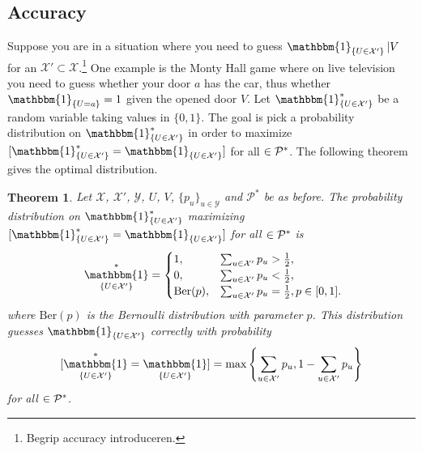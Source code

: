 \documentclass[twoside,a4paper]{report}
\theoremstyle{plain}
\newtheorem{theorem}{Theorem}[section]
\theoremstyle{definition}
\theoremstyle{remark}
\numberwithin{equation}{chapter}
\let\P\relax
\DeclareMathOperator{\P}{\mathbb{P}}
\DeclareMathOperator{\1}{\mathbbm{1}}
\newcommand{\X}{\mathcal{X}}
\newcommand{\Y}{\mathcal{Y}}
\newcommand{\Pmod}{\mathcal{P}^*}
\newcommand{\GeneralGenInd}{\1_{\{U\in\X'\}}}
\begin{document}
\subsection{Accuracy}
Suppose you are in a situation where you need to guess $\GeneralGenInd|V$ for an $\X'\subset\X$.\footnote{Begrip accuracy introduceren.} One example is the Monty Hall game where on live television you need to guess whether your door $a$ has the car, thus whether $\1_{\{U=a\}}=1$ given the opened door $V$. Let $\GeneralGenInd^*$ be a random variable taking values in $\{0,1\}$. The goal is pick a probability distribution on $\GeneralGenInd^*$ in order to maximize $\P[\GeneralGenInd^*=\GeneralGenInd]$ for all $\P\in\Pmod$. The following theorem gives the optimal distribution.
\begin{theorem}\label{thm:DiscAccOpt}
Let $\X$, $\X'$, $\Y$, $U$, $V$, $\{p_u\}_{u\in\Y}$ and $\Pmod$ be as before. The probability distribution on $\GeneralGenInd^*$ maximizing $\P[\GeneralGenInd^*=\GeneralGenInd]$ for all $\P\in\Pmod$ is
\begin{equation}\
\GeneralGenInd^*=\begin{cases}
1,&\sum_{u\in\X'}p_u>\frac{1}{2},\\
0,&\sum_{u\in\X'}p_u<\frac{1}{2},\\
\mathrm{Ber}(p),&\sum_{u\in\X'}p_u=\frac{1}{2},p\in[0,1].
\end{cases}
\end{equation}
where $\mathrm{Ber}(p)$ is the Bernoulli distribution with parameter $p$. This distribution guesses $\GeneralGenInd$ correctly with probability 
\begin{equation}
\P[\GeneralGenInd^*=\GeneralGenInd]=\max\left\{\sum_{u\in\X'}p_u,1-\sum_{u\in\X'}p_u\right\}
\end{equation}
for all $\P\in\Pmod$.
\end{theorem}
\end{document}
